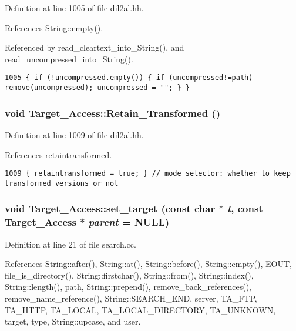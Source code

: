 Definition at line 1005 of file dil2al.hh.

References String::empty().

Referenced by read\_\-cleartext\_\-into\_\-String(), and read\_\-uncompressed\_\-into\_\-String().



\footnotesize\begin{verbatim}1005 { if (!uncompressed.empty()) { if (uncompressed!=path) remove(uncompressed); uncompressed = ""; } }
\end{verbatim}\normalsize 
{}
\subsubsection{\setlength{\rightskip}{0pt plus 5cm}void Target\_\-Access::Retain\_\-Transformed ()\hspace{0.3cm}{\tt  [inline]}}\label{classTarget__Access_a17}




Definition at line 1009 of file dil2al.hh.

References retaintransformed.



\footnotesize\begin{verbatim}1009 { retaintransformed = true; } // mode selector: whether to keep transformed versions or not
\end{verbatim}\normalsize 
{}
\subsubsection{\setlength{\rightskip}{0pt plus 5cm}void Target\_\-Access::set\_\-target (const char $\ast$ {\em t}, const Target\_\-Access $\ast$ {\em parent} = NULL)\hspace{0.3cm}{\tt  [protected]}}\label{classTarget__Access_b0}




Definition at line 21 of file search.cc.

References String::after(), String::at(), String::before(), String::empty(), EOUT, file\_\-is\_\-directory(), String::firstchar(), String::from(), String::index(), String::length(), path, String::prepend(), remove\_\-back\_\-references(), remove\_\-name\_\-reference(), String::SEARCH\_\-END, server, TA\_\-FTP, TA\_\-HTTP, TA\_\-LOCAL, TA\_\-LOCAL\_\-DIRECTORY, TA\_\-UNKNOWN, target, type, String::upcase, and user.

